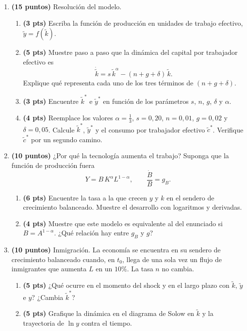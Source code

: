 \documentclass[11pt]{article}
\begin{document}
\begin{enumerate}[leftmargin=*, itemsep=12pt]

\item \textbf{(15 puntos)} Resolución del modelo.
\begin{enumerate}[label=\alph*), leftmargin=*, itemsep=4pt]
\item \textbf{(3 pts)} Escriba la función de producción en unidades de trabajo efectivo, $\tilde y = f(\tilde k)$.
\item \textbf{(5 pts)} Muestre paso a paso que la dinámica del capital por trabajador efectivo es
\[
\dot{\tilde k} = s\,\tilde k^{\alpha} - (n + g + \delta)\,\tilde k .
\]
Explique qué representa cada uno de los tres términos de $(n+g+\delta)$.
\item \textbf{(3 pts)} Encuentre $\tilde k^{*}$ e $\tilde y^{*}$ en función de los parámetros $s$, $n$, $g$, $\delta$ y $\alpha$.
\item \textbf{(4 pts)} Reemplace los valores $\alpha = \tfrac{1}{3}$, $s = 0{,}20$, $n = 0{,}01$, $g = 0{,}02$ y $\delta = 0{,}05$. Calcule $\tilde k^{*}$, $\tilde y^{*}$ y el consumo por trabajador efectivo $\tilde c^{*}$. Verifique $\tilde c^{*}$ por un segundo camino.
\end{enumerate}

\item \textbf{(10 puntos)} ¿Por qué la tecnología aumenta el trabajo? Suponga que la función de producción fuera
\[
Y = B\,K^{\alpha}L^{1-\alpha}, \qquad \frac{\dot B}{B} = g_B .
\]
\begin{enumerate}[label=\alph*), leftmargin=*, itemsep=4pt]
\item \textbf{(6 pts)} Encuentre la tasa a la que crecen $y$ y $k$ en el sendero de crecimiento balanceado. Muestre el desarrollo con logaritmos y derivadas.
\item \textbf{(4 pts)} Muestre que este modelo es equivalente al del enunciado si $B = A^{1-\alpha}$. ¿Qué relación hay entre $g_B$ y $g$?
\end{enumerate}

\item \textbf{(10 puntos)} Inmigración. La economía se encuentra en su sendero de crecimiento balanceado cuando, en $t_0$, llega de una sola vez un flujo de inmigrantes que aumenta $L$ en un $10\%$. La tasa $n$ no cambia.
\begin{enumerate}[label=\alph*), leftmargin=*, itemsep=4pt]
\item \textbf{(5 pts)} ¿Qué ocurre en el momento del shock y en el largo plazo con $\tilde k$, $\tilde y$ e $y$? ¿Cambia $\tilde k^{*}$?
\item \textbf{(5 pts)} Grafique la dinámica en el diagrama de Solow en $\tilde k$ y la trayectoria de $\ln y$ contra el tiempo.
\end{enumerate}


\end{enumerate}
\end{document}
